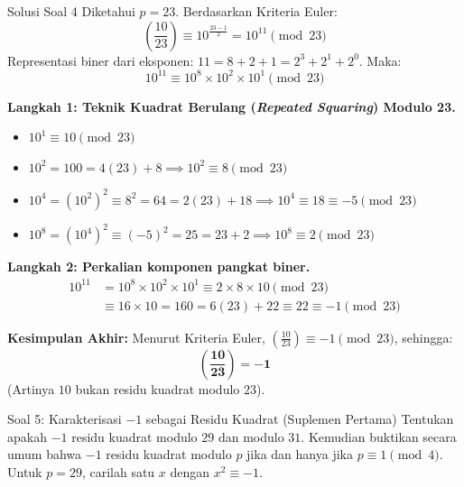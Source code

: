 \documentclass[11pt,a4paper]{article}
\begin{document}
\begin{solusibox}{Solusi Soal 4}
Diketahui $p = 23$. Berdasarkan Kriteria Euler:
\[
\left(\frac{10}{23}\right) \equiv 10^{\frac{23-1}{2}} = 10^{11} \pmod{23}
\]
Representasi biner dari eksponen: $11 = 8 + 2 + 1 = 2^3 + 2^1 + 2^0$.  
Maka:
\[
10^{11} \equiv 10^8 \times 10^2 \times 10^1 \pmod{23}
\]

\textbf{Langkah 1: Teknik Kuadrat Berulang (\textit{Repeated Squaring}) Modulo 23.}
\begin{itemize}
    \item $10^1 \equiv 10 \pmod{23}$
    \item $10^2 = 100 = 4(23) + 8 \implies 10^2 \equiv 8 \pmod{23}$
    \item $10^4 = (10^2)^2 \equiv 8^2 = 64 = 2(23) + 18 \implies 10^4 \equiv 18 \equiv -5 \pmod{23}$
    \item $10^8 = (10^4)^2 \equiv (-5)^2 = 25 = 23 + 2 \implies 10^8 \equiv 2 \pmod{23}$
\end{itemize}

\textbf{Langkah 2: Perkalian komponen pangkat biner.}
\begin{align*}
10^{11} &= 10^8 \times 10^2 \times 10^1 \equiv 2 \times 8 \times 10 \pmod{23} \\
&\equiv 16 \times 10 = 160 = 6(23) + 22 \equiv 22 \equiv -1 \pmod{23}
\end{align*}

\textbf{Kesimpulan Akhir:} Menurut Kriteria Euler, $\left(\frac{10}{23}\right) \equiv -1 \pmod{23}$, sehingga:
\[
\mathbf{\left(\frac{10}{23}\right) = -1}
\]
(Artinya $10$ bukan residu kuadrat modulo $23$).
\end{solusibox}

\vspace{0.3cm}

\begin{soalbox}{Soal 5: Karakterisasi $-1$ sebagai Residu Kuadrat (Suplemen Pertama)}
Tentukan apakah $-1$ residu kuadrat modulo $29$ dan modulo $31$. Kemudian buktikan secara umum bahwa $-1$ residu kuadrat modulo $p$ jika dan hanya jika $p \equiv 1 \pmod 4$. Untuk $p = 29$, carilah satu $x$ dengan $x^2 \equiv -1$.
\end{soalbox}
\end{document}
